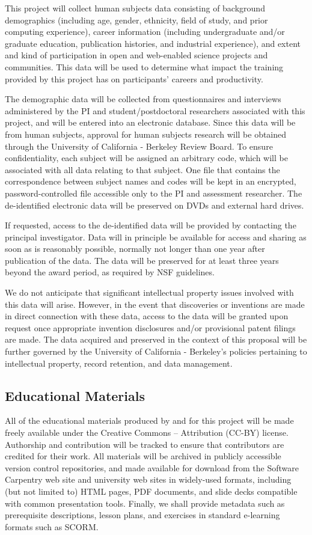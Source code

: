 \documentclass{proposalnsf}
\newlength{\up}
\begin{document}
This project will collect human subjects data consisting of background
demographics (including age, gender, ethnicity, field of study, and
prior computing experience), career information (including
undergraduate and/or graduate education, publication histories, and
industrial experience), and extent and kind of participation in open
and web-enabled science projects and communities.  This data will be
used to determine what impact the training provided by this project
has on participants' careers and productivity.

The demographic data will be collected from questionnaires and
interviews administered by the PI and student/postdoctoral researchers
associated with this project, and will be entered into an electronic
database.  Since this data will be from human subjects, approval for
human subjects research will be obtained through the University of
California - Berkeley Review Board.  To ensure confidentiality, each
subject will be assigned an arbitrary code, which will be associated
with all data relating to that subject.  One file that contains the
correspondence between subject names and codes will be kept in an
encrypted, password-controlled file accessible only to the PI and
assessment researcher.  The de-identified electronic data will be
preserved on DVDs and external hard drives.

If requested, access to the de-identified data will be provided by
contacting the principal investigator. Data will in principle be
available for access and sharing as soon as is reasonably possible,
normally not longer than one year after publication of the data. The
data will be preserved for at least three years beyond the award
period, as required by NSF guidelines.

We do not anticipate that significant intellectual property issues
involved with this data will arise. However, in the event that
discoveries or inventions are made in direct connection with these
data, access to the data will be granted upon request once appropriate
invention disclosures and/or provisional patent filings are made.  The
data acquired and preserved in the context of this proposal will be
further governed by the University of California - Berkeley's policies
pertaining to intellectual property, record retention, and data
management.

\subsection*{Educational Materials}

All of the educational materials produced by and for this project will
be made freely available under the Creative Commons -- Attribution
(CC-BY) license.  Authorship and contribution will be tracked to
ensure that contributors are credited for their work.  All materials
will be archived in publicly accessible version control repositories,
and made available for download from the Software Carpentry web site
and university web sites in widely-used formats, including (but not
limited to) HTML pages, PDF documents, and slide decks compatible with
common presentation tools.  Finally, we shall provide metadata such as
prerequisite descriptions, lesson plans, and exercises in standard
e-learning formats such as SCORM.
\end{document}
